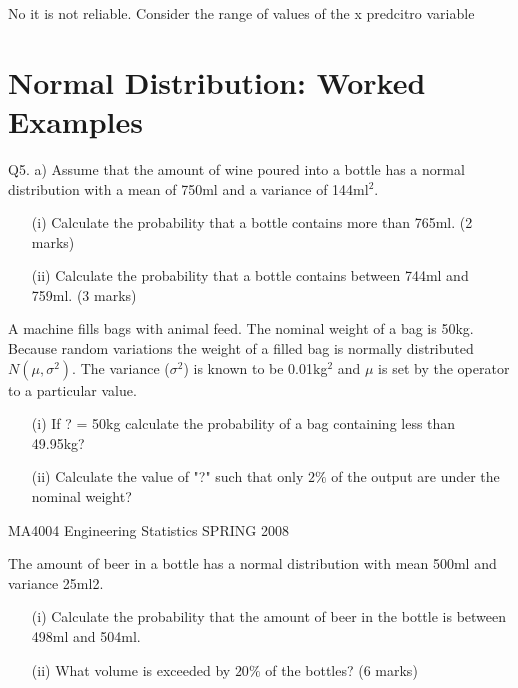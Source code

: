\documentclass[12pt]{report}
\begin{document}
No it is not reliable. Consider the range of values of the x predcitro variable










\section{Normal Distribution: Worked Examples}



Q5. a) Assume that the amount of wine poured into a bottle has a normal distribution with a mean of 750ml and a variance of 144ml$^2$.

\begin{itemize}

\item[(i)]  Calculate the probability that a bottle contains more than 765ml. (2 marks)
\item[(ii)]    Calculate the probability that a bottle contains between 744ml and 759ml. (3 marks)
\end{itemize}
A machine fills bags with animal feed. The nominal weight of a bag is 50kg.
Because random variations the weight of a filled bag is normally distributed
$N(\mu, \sigma^2)$. The variance ($\sigma^2$) is known to be 0.01kg$^2$ and $\mu$ is set by the
operator to a particular value.

\begin{itemize}
	\item[(i)] If ? = 50kg calculate the probability of a bag containing less than
49.95kg?
	\item[(ii)] Calculate the value of "?" such that only $2\%$ of the output are under the
nominal weight?
\end{itemize}

MA4004     Engineering Statistics    SPRING 2008


The amount of beer in a bottle has a normal distribution with mean 500ml and variance 25ml2.
\begin{itemize}
\item[(i)]	Calculate the probability that the amount of beer in the bottle is between 498ml and 504ml.
\item[(ii)]	What volume is exceeded by $20\%$ of the bottles?
(6 marks)
\end{itemize}
\end{document}
